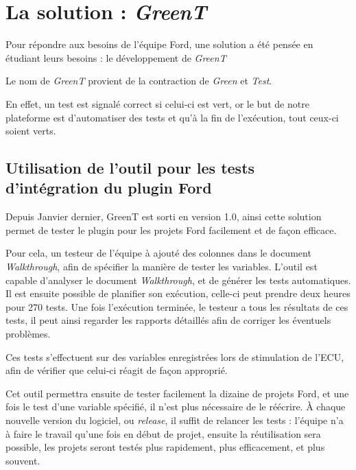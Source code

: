 	\section{La solution : \textit{GreenT}}
	Pour répondre aux besoins de l'équipe Ford, une solution a été pensée en étudiant leurs besoins : le développement de \textit{GreenT}
	\begin{remarque}
		Le nom de \textit{GreenT} provient de la contraction de \textit{Green} et \textit{Test}.
		
		En effet, un test est signalé correct si celui-ci est vert, or le but de notre plateforme est d'automatiser des tests et qu'à la fin de l'exécution, tout ceux-ci soient verts.
	\end{remarque}
	
	\subsection{Utilisation de l'outil pour les tests d'intégration du plugin Ford}
		Depuis Janvier dernier, GreenT est sorti en version 1.0, ainsi cette solution permet de tester le plugin pour les projets Ford facilement et de façon efficace.
		
		 Pour cela, un testeur de l'équipe à ajouté des colonnes dans le document \textit{Walkthrough}, afin de spécifier la manière de tester les variables. L'outil est capable d'analyser le document \textit{Walkthrough}, et de générer les tests automatiques. Il est ensuite possible de planifier son exécution, celle-ci peut prendre deux heures pour 270 tests. Une fois l'exécution terminée, le testeur a tous les résultats de ces tests, il peut ainsi regarder les rapports détaillés afin de corriger les éventuels problèmes.
	
	Ces tests s'effectuent sur des variables enregistrées lors de stimulation de l'ECU, afin de vérifier que celui-ci réagit de façon approprié.

	Cet outil permettra ensuite de tester facilement la dizaine de projets Ford, et une fois le test d'une variable spécifié, il n'est plus nécessaire de le réécrire. À chaque nouvelle version du logiciel, ou \textit{release}, il suffit de relancer les tests : l'équipe n'a à faire le travail qu'une fois en début de projet, ensuite la réutilisation sera possible, les projets seront testés plus rapidement, plus efficacement, et plus souvent.

